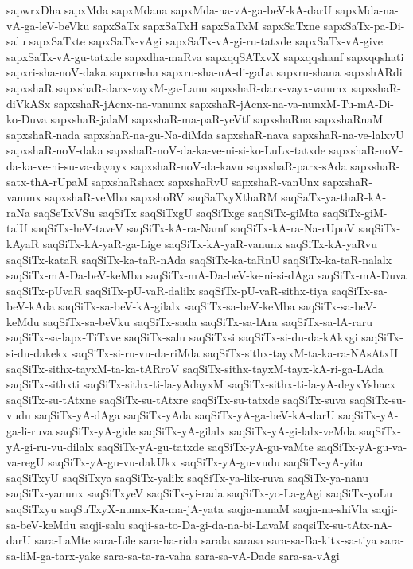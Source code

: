 {sapwrxDha
sapxMda
sapxMdana
sapxMda-na-vA-ga-beV-kA-darU
sapxMda-na-vA-ga-leV-beVku
sapxSaTx
sapxSaTxH
sapxSaTxM
sapxSaTxne
sapxSaTx-pa-Di-salu
sapxSaTxte
sapxSaTx-vAgi
sapxSaTx-vA-gi-ru-tatxde
sapxSaTx-vA-give
sapxSaTx-vA-gu-tatxde
sapxdha-maRva
sapxqqSATxvX
sapxqqshanf
sapxqqshati
sapxri-sha-noV-daka
sapxrusha
sapxru-sha-nA-di-gaLa
sapxru-shana
sapxshARdi
sapxshaR
sapxshaR-darx-vayxM-ga-Lanu
sapxshaR-darx-vayx-vanunx
sapxshaR-diVkASx
sapxshaR-jAcnx-na-vanunx
sapxshaR-jAcnx-na-va-nunxM-Tu-mA-Di-ko-Duva
sapxshaR-jalaM
sapxshaR-ma-paR-yeVtf
sapxshaRna
sapxshaRnaM
sapxshaR-nada
sapxshaR-na-gu-Na-diMda
sapxshaR-nava
sapxshaR-na-ve-lalxvU
sapxshaR-noV-daka
sapxshaR-noV-da-ka-ve-ni-si-ko-LuLx-tatxde
sapxshaR-noV-da-ka-ve-ni-su-va-dayayx
sapxshaR-noV-da-kavu
sapxshaR-parx-sAda
sapxshaR-satx-thA-rUpaM
sapxshaRshacx
sapxshaRvU
sapxshaR-vanUnx
sapxshaR-vanunx
sapxshaR-veMba
sapxshoRV
saqSaTxyXthaRM
saqSaTx-ya-thaR-kA-raNa
saqSeTxVSu
saqSiTx
saqSiTxgU
saqSiTxge
saqSiTx-giMta
saqSiTx-giM-talU
saqSiTx-heV-taveV
saqSiTx-kA-ra-Namf
saqSiTx-kA-ra-Na-rUpoV
saqSiTx-kAyaR
saqSiTx-kA-yaR-ga-Lige
saqSiTx-kA-yaR-vanunx
saqSiTx-kA-yaRvu
saqSiTx-kataR
saqSiTx-ka-taR-nAda
saqSiTx-ka-taRnU
saqSiTx-ka-taR-nalalx
saqSiTx-mA-Da-beV-keMba
saqSiTx-mA-Da-beV-ke-ni-si-dAga
saqSiTx-mA-Duva
saqSiTx-pUvaR
saqSiTx-pU-vaR-dalilx
saqSiTx-pU-vaR-sithx-tiya
saqSiTx-sa-beV-kAda
saqSiTx-sa-beV-kA-gilalx
saqSiTx-sa-beV-keMba
saqSiTx-sa-beV-keMdu
saqSiTx-sa-beVku
saqSiTx-sada
saqSiTx-sa-lAra
saqSiTx-sa-lA-raru
saqSiTx-sa-lapx-TiTxve
saqSiTx-salu
saqSiTxsi
saqSiTx-si-du-da-kAkxgi
saqSiTx-si-du-dakekx
saqSiTx-si-ru-vu-da-riMda
saqSiTx-sithx-tayxM-ta-ka-ra-NAsAtxH
saqSiTx-sithx-tayxM-ta-ka-tARroV
saqSiTx-sithx-tayxM-tayx-kA-ri-ga-LAda
saqSiTx-sithxti
saqSiTx-sithx-ti-la-yAdayxM
saqSiTx-sithx-ti-la-yA-deyxYshacx
saqSiTx-su-tAtxne
saqSiTx-su-tAtxre
saqSiTx-su-tatxde
saqSiTx-suva
saqSiTx-su-vudu
saqSiTx-yA-dAga
saqSiTx-yAda
saqSiTx-yA-ga-beV-kA-darU
saqSiTx-yA-ga-li-ruva
saqSiTx-yA-gide
saqSiTx-yA-gilalx
saqSiTx-yA-gi-lalx-veMda
saqSiTx-yA-gi-ru-vu-dilalx
saqSiTx-yA-gu-tatxde
saqSiTx-yA-gu-vaMte
saqSiTx-yA-gu-va-va-regU
saqSiTx-yA-gu-vu-dakUkx
saqSiTx-yA-gu-vudu
saqSiTx-yA-yitu
saqSiTxyU
saqSiTxya
saqSiTx-yalilx
saqSiTx-ya-lilx-ruva
saqSiTx-ya-nanu
saqSiTx-yanunx
saqSiTxyeV
saqSiTx-yi-rada
saqSiTx-yo-La-gAgi
saqSiTx-yoLu
saqSiTxyu
saqSuTxyX-numx-Ka-ma-jA-yata
saqja-nanaM
saqja-na-shiVla
saqji-sa-beV-keMdu
saqji-salu
saqji-sa-to-Da-gi-da-na-bi-LavaM
saqsiTx-su-tAtx-nA-darU
sara-LaMte
sara-Lile
sara-ha-rida
sarala
sarasa
sara-sa-Ba-kitx-sa-tiya
sara-sa-liM-ga-tarx-yake
sara-sa-ta-ra-vaha
sara-sa-vA-Dade
sara-sa-vAgi
}
